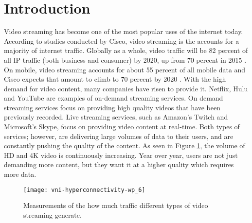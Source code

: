 \documentclass[12pt]{article}
\begin{document}
\section{Introduction}
Video streaming has become one of the most popular uses of the internet today.  According to studies conducted by Cisco, video streaming is the accounts for a majority of internet traffic.  Globally as a whole, video traffic will be 82 percent of all IP traffic (both business and consumer) by 2020, up from 70 percent in 2015 \cite{ciscozetabyte}.  On mobile, video streaming accounts for about 55 percent of all mobile data and Cisco expects that amount to climb to 70 percent by 2020 \cite{cisconetworkindex}.  With the high demand for video content, many companies have risen to provide it.  Netflix, Hulu and YouTube are examples of on-demand streaming services.  On demand streaming services focus on providing high quality videos that have been previously recorded.  Live streaming services, such as Amazon's Twitch and Microsoft's Skype, focus on providing video content at real-time.  Both types of services; however, are delivering large volumes of data to their users, and are constantly pushing the quality of the content. As seen in Figure \ref{fig:videostreamingdist}, the volume of HD and 4K video is continuously increasing.  Year over year, users are not just demanding more content, but they want it at a higher quality which requires more data.

\begin{figure}
  \begin{center}
    \texttt{[image: vni-hyperconnectivity-wp\_6]}
    \caption{Measurements of the how much traffic different types of video streaming generate.}
    \label{fig:videostreamingdist}
  \end{center}
\end{figure}
\end{document}

